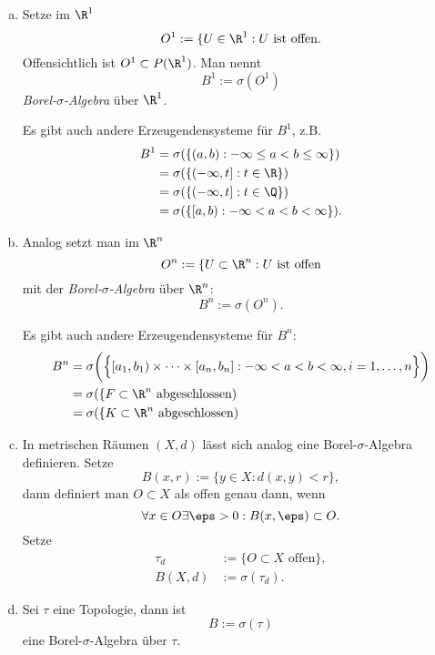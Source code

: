 \begin{ex} \label{1.1.6}
	\begin{enumerate}[(a)]
		\item
			Setze im $\R^1$
			\[
				O^1
				:= \{ U \in \R^1 : \text{$U$ ist offen}.
			\]
			Offensichtlich ist $O^1 \subset P(\R^1)$.
			Man nennt
			\[
				B^1 := \sigma(O^1)
			\]
			\emph{Borel-$\sigma$-Algebra} über $\R^1$.

			Es gibt auch andere Erzeugendensysteme für $B^1$, z.B.
			\begin{align*}
				B^1
				&= \sigma(\{(a,b) : -\infty \le a < b \le \infty\}) \\
				&= \sigma(\{(-\infty,t] : t \in \R\}) \\
				&= \sigma(\{(-\infty,t] : t \in \Q\}) \\
				&= \sigma(\{[a,b) : -\infty < a < b < \infty \}). \\
			\end{align*}
		\item
			Analog setzt man im $\R^n$
			\[
				O^n
				:= \{ U \subset \R^n : \text{$U$ ist offen}
			\]
			mit der \emph{Borel-$\sigma$-Algebra} über $\R^n$:
			\[
				B^n := \sigma(O^n).
			\]

			Es gibt auch andere Erzeugendensysteme für $B^n$:
			\begin{align*}
				B^n
				&= \sigma \bigg( \Big\{ [a_1,b_1) \times \dotsb \times [a_n,b_n] : -\infty < a < b < \infty, i = 1, \dotsc, n \Big\} \bigg) \\
				&= \sigma( \{F \subset \R^n \text{ abgeschlossen} ) \\
				&= \sigma( \{K \subset \R^n \text{ abgeschlossen} )
			\end{align*}
		\item
			In metrischen Räumen $(X,d)$ lässt sich analog eine Borel-$\sigma$-Algebra definieren.
			Setze
			\[
				B(x,r) := \{ y \in X : d(x,y) < r \},
			\]
			dann definiert man $O \subset X$ als offen genau dann, wenn
			\[
				\forall x \in O \exists \eps > 0 : B(x,\eps) \subset O.
			\]
			Setze
			\begin{align*}
				\tau_d &:= \{ O \subset X \text{ offen} \}, \\
				B(X,d) &:= \sigma(\tau_d).
			\end{align*}
		\item
			Sei $\tau$ eine Topologie, dann ist
			\[
				B := \sigma(\tau)
			\]
			eine Borel-$\sigma$-Algebra über $\tau$.
	\end{enumerate}
\end{ex}


